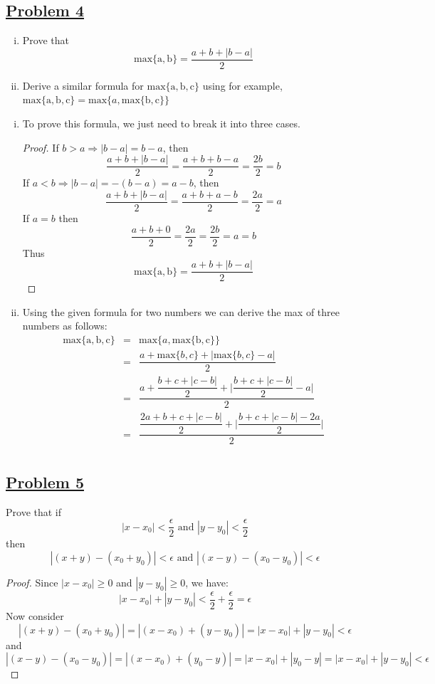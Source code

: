 \documentclass[10pt,letterpaper]{article}
\begin{document}
	\subsection*{{\color{purple}\underline{Problem 4}}}
	 \text{  } 
	\begin{enumerate}[(i)]
		\item Prove that $$\mathrm{max\{a, b\}} = \dfrac{a + b + |b - a|}{2}$$
		\item Derive a similar formula for $\mathrm{max\{a, b, c\}}$ using for example,
		$\mathrm{max\{a, b, c\}} = \mathrm{max}\{a, \mathrm{max\{b, c\}}\}$
	\end{enumerate}
	\begin{enumerate}[(i)]
		\item To prove this formula, we just need to break it into three cases.
		\begin{proof}
			If $b > a \Rightarrow |b - a| = b - a$, then
			$$\dfrac{a + b + |b - a|}{2} = \dfrac{a + b + b - a}{2} = \dfrac{2b}{2} = b$$
			If $a < b \Rightarrow |b - a| = -(b - a) = a - b$, then 
			$$\dfrac{a + b + |b - a|}{2} = \dfrac{a + b + a - b}{2} = \dfrac{2a}{2} = a$$
			If $a = b$ then 
			$$\dfrac{a + b + 0}{2} = \dfrac{2a}{2} = \dfrac{2b}{2} = a = b$$
			Thus $$\mathrm{max\{a, b\}} = \dfrac{a + b + |b - a|}{2}$$
		\end{proof}
		\item Using the given formula for two numbers we can derive the max of three numbers as follows:
		\begin{eqnarray*}
			\mathrm{max\{a, b, c\}} & = & \mathrm{max}\{a, \mathrm{max\{b, c\}}\} \\
			 & = & \dfrac{a + \mathrm{max}\{b, c\} + |\mathrm{max}\{b, c\} - a|}{2} \\
			 & = & \dfrac{a + \dfrac{b + c + |c - b|}{2} + \bigg|\dfrac{b + c + |c - b|}{2} - a\bigg|}{2} \\
			 & = & \dfrac{\dfrac{2a + b + c + |c - b|}{2} + \bigg|\dfrac{b + c + |c - b| - 2a}{2}\bigg|}{2} \\
		\end{eqnarray*}
	\end{enumerate}
	
	\subsection*{{\color{purple}\underline{Problem 5}}}
	Prove that if 
	$$|x - x_0| < \dfrac{\epsilon}{2} \text{ and } |y - y_0| < \dfrac{\epsilon}{2}$$
	then 
	$$|(x + y) - (x_0 + y_0)| < \epsilon \text{ and } |(x - y) - (x_0 - y_0)| < \epsilon$$
	\begin{proof}
		Since $|x - x_0| \geq 0$ and $|y - y_0| \geq 0$, we have:
	$$|x - x_0| + |y - y_0| < \dfrac{\epsilon}{2} + \dfrac{\epsilon}{2} = \epsilon$$
	Now consider
		$$|(x + y) - (x_0 + y_0)| = |(x - x_0) + (y - y_0)| = |x - x_0| + |y - y_0| < \epsilon$$
	and 
		$$|(x - y) - (x_0 - y_0)| = |(x - x_0) + (y_0 - y)| = |x - x_0| + |y_0 - y| 
		= |x - x_0| + |y - y_0| < \epsilon$$	 
	\end{proof}		
	
\end{document}
